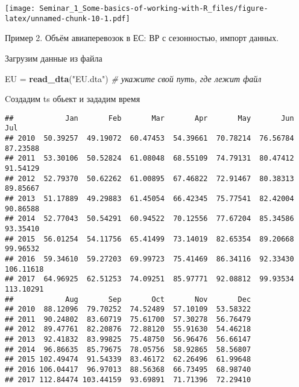 \documentclass[
]{article}
\newenvironment{Shaded}{\begin{snugshade}}{\end{snugshade}}
\newcommand{\AttributeTok}[1]{\textcolor[rgb]{0.13,0.29,0.53}{#1}}
\newcommand{\CommentTok}[1]{\textcolor[rgb]{0.56,0.35,0.01}{\textit{#1}}}
\newcommand{\DecValTok}[1]{\textcolor[rgb]{0.00,0.00,0.81}{#1}}
\newcommand{\FunctionTok}[1]{\textcolor[rgb]{0.13,0.29,0.53}{\textbf{#1}}}
\newcommand{\NormalTok}[1]{#1}
\newcommand{\OtherTok}[1]{\textcolor[rgb]{0.56,0.35,0.01}{#1}}
\newcommand{\SpecialCharTok}[1]{\textcolor[rgb]{0.81,0.36,0.00}{\textbf{#1}}}
\newcommand{\StringTok}[1]{\textcolor[rgb]{0.31,0.60,0.02}{#1}}
\begin{document}
\texttt{[image: Seminar\_1\_Some-basics-of-working-with-R\_files/figure-latex/unnamed-chunk-10-1.pdf]}

Пример 2. Объём авиаперевозок в ЕС: ВР с сезонностью, импорт данных.

Загрузим данные из файла

\begin{Shaded}
\begin{Highlighting}[]
\NormalTok{EU }\OtherTok{=} \FunctionTok{read\_dta}\NormalTok{(}\StringTok{"EU.dta"}\NormalTok{)  }\CommentTok{\# укажите свой путь, где лежит файл}
\end{Highlighting}
\end{Shaded}

Cоздадим ts обьект и зададим время

\begin{Shaded}
\end{Shaded}

\begin{verbatim}
##            Jan       Feb       Mar       Apr       May       Jun       Jul
## 2010  50.39257  49.19072  60.47453  54.39661  70.78214  76.56784  87.23588
## 2011  53.30106  50.52824  61.08048  68.55109  74.79131  80.47412  91.54129
## 2012  52.79370  50.62262  61.00895  67.46822  72.91467  80.38313  89.85667
## 2013  51.17889  49.29883  61.45054  66.42345  75.77541  82.42004  90.86588
## 2014  52.77043  50.54291  60.94522  70.12556  77.67204  85.34586  93.35410
## 2015  56.01254  54.11756  65.41499  73.14019  82.65354  89.20668  99.96532
## 2016  59.34610  59.27203  69.99723  75.41469  86.34116  92.33430 106.11618
## 2017  64.96925  62.51253  74.09251  85.97771  92.08812  99.93534 113.10291
##            Aug       Sep       Oct       Nov       Dec
## 2010  88.12096  79.70252  74.52489  57.10109  53.58322
## 2011  90.24802  83.60719  75.61700  57.30278  56.76479
## 2012  89.47761  82.20876  72.88120  55.91630  54.46218
## 2013  92.41832  83.99825  75.48750  56.96476  56.66147
## 2014  96.86635  85.79675  78.05756  58.92865  58.56807
## 2015 102.49474  91.54339  83.46172  62.26496  61.99648
## 2016 106.04417  96.97013  88.56368  66.73495  68.98740
## 2017 112.84474 103.44159  93.69891  71.71396  72.29410
\end{verbatim}
\end{document}
